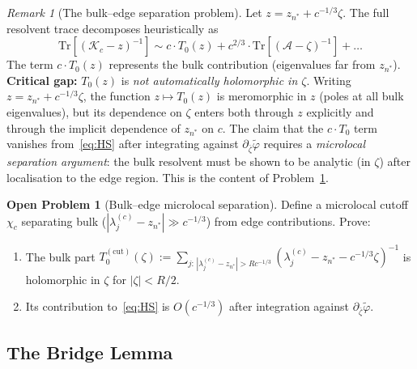 \documentclass[12pt,a4paper]{amsart}
\theoremstyle{definition}
\newtheorem{problem}[theorem]{Open Problem}
\theoremstyle{remark}
\newtheorem{remark}[theorem]{Remark}
\newcommand{\Kc}{\mathcal{K}_c}
\newcommand{\Tr}{\mathrm{Tr}}
\newcommand{\lam}[2]{\lambda_{#2}^{(#1)}}
\newcommand{\cA}{\mathcal{A}}
\begin{document}
\begin{remark}[The bulk--edge separation problem]
\label{rem:bulkedge}
Let $z = z_{n^*} + c^{-1/3}\zeta$.
The full resolvent trace decomposes heuristically as
\begin{equation}\label{eq:decomp}
 \Tr[(\Kc - z)^{-1}]
 \sim c\cdot T_0(z) + c^{2/3}\cdot \Tr[(\cA-\zeta)^{-1}] + \ldots
\end{equation}
The term $c\cdot T_0(z)$ represents the bulk contribution
(eigenvalues far from $z_{n^*}$).
\textbf{Critical gap:}
$T_0(z)$ is \emph{not automatically holomorphic in $\zeta$}.
Writing $z = z_{n^*} + c^{-1/3}\zeta$,
the function $z \mapsto T_0(z)$ is meromorphic in $z$
(poles at all bulk eigenvalues),
but its dependence on $\zeta$ enters both through $z$ explicitly
and through the implicit dependence of $z_{n^*}$ on $c$.
The claim that the $c\cdot T_0$ term vanishes from~\eqref{eq:HS}
after integrating against $\partial_{\bar\zeta}\tilde\varphi$
requires a \emph{microlocal separation argument}:
the bulk resolvent must be shown to be analytic (in $\zeta$)
after localisation to the edge region.
This is the content of Problem~\ref{prob:bulksep}.
\end{remark}

\begin{problem}[Bulk--edge microlocal separation]
\label{prob:bulksep}
Define a microlocal cutoff $\chi_c$ separating bulk
($|\lam{c}{j} - z_{n^*}| \gg c^{-1/3}$) from edge contributions.
Prove:
\begin{enumerate}[nosep,label=(B\arabic*)]
 \item The bulk part $T_0^{(\mathrm{cut})}(\zeta)
 := \sum_{j:\,|\lam{c}{j}-z_{n^*}|>Rc^{-1/3}}
 (\lam{c}{j} - z_{n^*} - c^{-1/3}\zeta)^{-1}$
 is holomorphic in $\zeta$ for $|\zeta| < R/2$.
 \item Its contribution to~\eqref{eq:HS} is $O(c^{-1/3})$
 after integration against $\partial_{\bar\zeta}\tilde\varphi$.
\end{enumerate}
\end{problem}

\subsection{The Bridge Lemma}
\end{document}
